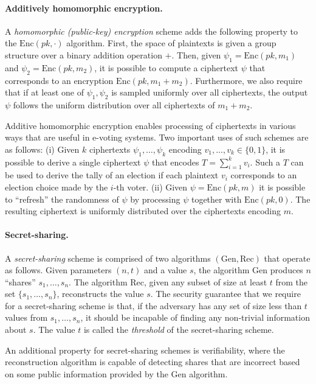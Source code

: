 \paragraph{Additively homomorphic encryption.} A \emph{homomorphic
  (public-key) encryption} scheme adds the following property to the
$\mathrm{Enc}(pk, \cdot)$ algorithm. First, the space of plaintexts is
given a group structure over a binary addition operation $+$. Then,
given $\psi_1 = \mathrm{Enc}(pk, m_1)$ and
$\psi_2 = \mathrm{Enc}(pk, m_2)$, it is possible to compute a
ciphertext $\psi$ that corresponds to an encryption
$\mathrm{Enc}(pk, m_1 + m_2)$. Furthermore, we also require that if at
least one of $\psi_1, \psi_2$ is sampled uniformly over all
ciphertexts, the output $\psi$ follows the uniform distribution over
all ciphertexts of $m_1 + m_2$.

Additive homomorphic encryption enables processing of ciphertexts in
various ways that are useful in e-voting systems. Two important uses
of such schemes are as follows: (i) Given $k$ ciphertexts
$\psi_1, \ldots, \psi_k$ encoding $v_1, \ldots, v_k \in \{0,1\}$, it
is possible to derive a single ciphertext $\psi$ that encodes
$T= \sum^k_{i=1} v_i$. Such a $T$ can be used to derive the tally of
an election if each plaintext $v_i$ corresponds to an election choice
made by the $i$-th voter. (ii) Given $\psi = \mathrm{Enc}(pk, m)$ it
is possible to ``refresh'' the randomness of $\psi$ by processing
$\psi$ together with $\mathrm{Enc}(pk, 0)$. The resulting ciphertext
is uniformly distributed over the ciphertexts encoding $m$.

\paragraph{Secret-sharing.} A \emph{secret-sharing} scheme is
comprised of two algorithms $(\mathrm{Gen}, \mathrm{Rec})$ that
operate as follows. Given parameters $(n,t)$ and a value $s$, the
algorithm $\mathrm{Gen}$ produces $n$ ``shares'' $s_1, \ldots, s_n$.
The algorithm $\mathrm{Rec}$, given any subset of size at least $t$
from the set $\{s_1, \ldots, s_n\}$, reconstructs the value $s$. The
security guarantee that we require for a secret-sharing scheme is
that, if the adversary has any set of size less than $t$ values from
$s_1,\ldots, s_n$, it should be incapable of finding any non-trivial
information about $s$. The value $t$ is called the \emph{threshold} of
the secret-sharing scheme.

An additional property for secret-sharing schemes is verifiability,
where the reconstruction algorithm is capable of detecting shares that
are incorrect based on some public information provided by the
$\mathrm{Gen}$ algorithm.

